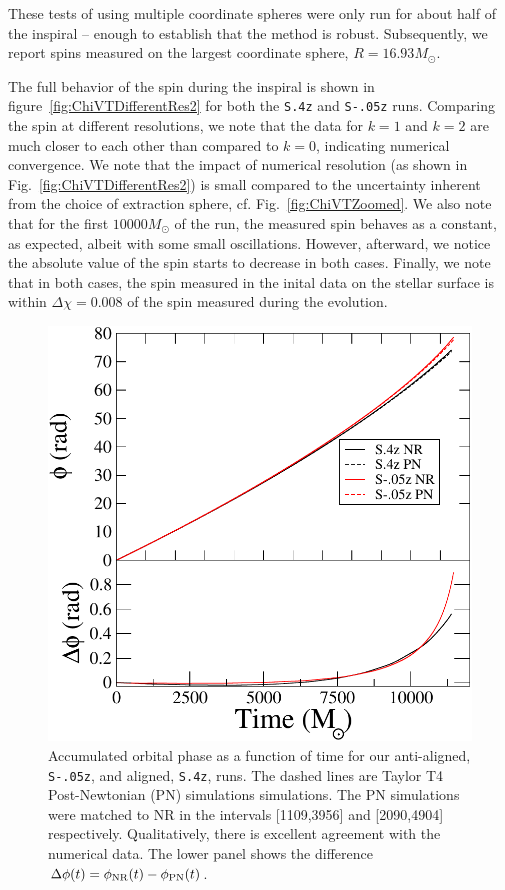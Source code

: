 These tests of using multiple coordinate spheres were only run for
about half of the inspiral -- enough to establish that the method is
robust. Subsequently, we report spins measured on the largest
coordinate sphere, $R=16.93M_\odot$.

The full behavior of the spin during the inspiral is shown in
figure~\ref{fig:ChiVTDifferentRes2} for both the {\tt S.4z} and {\tt S-.05z} runs.
Comparing the spin at different resolutions, we note that the data for
$k\!=\!1$ and $k\!=\!2$ are much closer to each other than compared to
$k\!=\!0$, indicating numerical convergence. We note that the impact
of numerical resolution (as shown in
Fig.~\ref{fig:ChiVTDifferentRes2}) is small compared to the
uncertainty inherent from the choice of extraction sphere,
cf. Fig.~\ref{fig:ChiVTZoomed}. We also note that for the first
$10000M_{\odot}$ of the run, the measured spin behaves as a constant,
as expected, albeit with some small oscillations. However,
afterward, we notice the
absolute value of the spin starts to decrease in both cases.
Finally, we note that in both cases, the spin measured in the inital
data on the stellar surface is within $\Delta \chi = 0.008$ of the spin
measured during the evolution. 

\begin{figure}
\includegraphics[width=0.95\columnwidth]{chap2/PhaseComparison}
\caption[Accumulated orbital phase as a function of time for our aligned and anti-aligned runs.]{ {\label{fig:Hangup}} Accumulated orbital phase as a function
  of time for our anti-aligned, {\tt S-.05z}, and aligned, {\tt S.4z}, runs. The
  dashed lines are Taylor T4 Post-Newtonian (PN) simulations simulations. The PN simulations were
  matched to NR in the intervals [1109,3956] and [2090,4904]
  respectively. Qualitatively, there
  is excellent agreement with the numerical data. The lower panel
  shows the difference
  $\Delta\phi(t)=\phi_{\rm NR}(t)-\phi_{\rm PN}(t)$.}
\end{figure}

